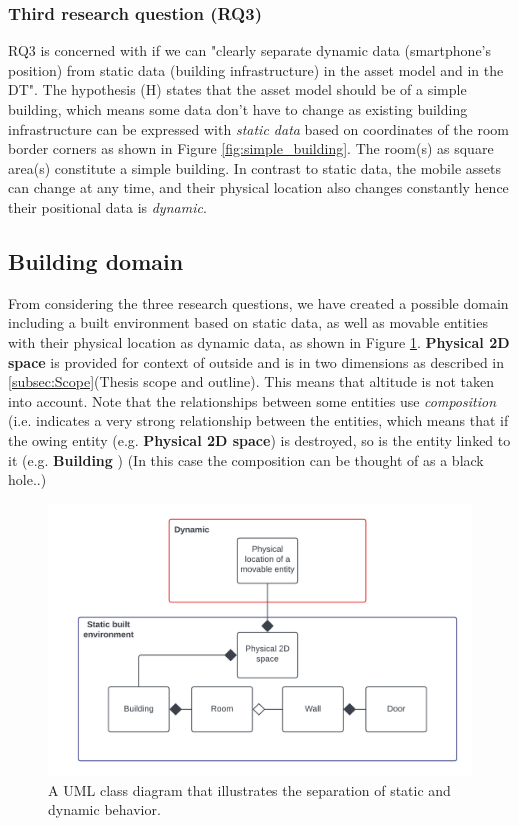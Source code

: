 \documentclass{article}
\begin{document}
\subsubsection{Third research question (RQ3)}
RQ3 is concerned with if we can "clearly separate dynamic data (smartphone's position) from static data (building infrastructure) in the asset model and in the DT". The hypothesis (H) states that the asset model should be of a simple building, which means some data don't have to change as existing building infrastructure can be expressed with \emph{static data} based on coordinates of the room border corners as shown in Figure \ref{fig:simple_building}. The room(s) as square area(s) constitute a simple building. In contrast to static data, the mobile assets can change at any time, and their physical location also changes constantly hence their positional data is \emph{dynamic}.

\subsection{Building domain}
From considering the three research questions, we have created a possible domain including a built environment based on static data, as well as movable entities with their physical location as dynamic data, as shown in Figure \ref{fig:static_built_environment}. \textbf{Physical 2D space} is provided for context of outside and is in two dimensions as described in \ref{subsec:Scope}(Thesis scope and outline). This means that altitude is not taken into account. Note that the relationships between some entities use \emph{composition} (i.e. indicates a very strong relationship between the entities, which means that if the owing entity (e.g. \textbf{Physical 2D space}) is destroyed, so is the entity linked to it (e.g. \textbf{Building} \cite{pilone_uml_2005}) (In this case the composition can be thought of as a black hole..)

\begin{figure}[H]
    \centering
    \includegraphics[scale=0.16]{graphics/static_built_environment.png}
    \caption{A UML class diagram that illustrates the separation of static and dynamic behavior.}
    \label{fig:static_built_environment}
\end{figure}
\end{document}
